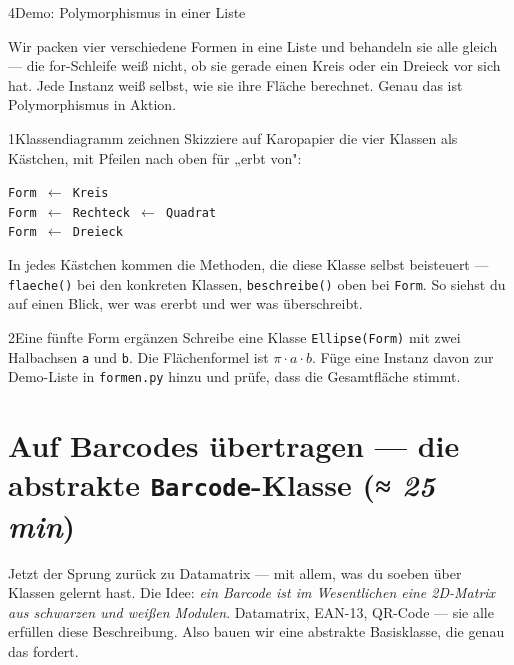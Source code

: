 \begin{pythoneinheit}{4}{Demo: Polymorphismus in einer Liste}

Wir packen vier verschiedene Formen in eine Liste und behandeln sie
alle gleich — die for-Schleife weiß nicht, ob sie gerade einen Kreis
oder ein Dreieck vor sich hat. Jede Instanz weiß selbst, wie sie ihre
Fläche berechnet. Genau das ist Polymorphismus in Aktion.
\end{pythoneinheit}

\begin{bleistiftuebung}{1}{Klassendiagramm zeichnen}
Skizziere auf Karopapier die vier Klassen als Kästchen, mit Pfeilen
nach oben für „erbt von":

\begin{center}
\texttt{Form $\leftarrow$ Kreis} \\
\texttt{Form $\leftarrow$ Rechteck $\leftarrow$ Quadrat} \\
\texttt{Form $\leftarrow$ Dreieck}
\end{center}

In jedes Kästchen kommen die Methoden, die diese Klasse selbst
beisteuert — \texttt{flaeche()} bei den konkreten Klassen,
\texttt{beschreibe()} oben bei \texttt{Form}. So siehst du auf einen
Blick, wer was ererbt und wer was überschreibt.
\end{bleistiftuebung}

\begin{bleistiftuebung}{2}{Eine fünfte Form ergänzen}
Schreibe eine Klasse \texttt{Ellipse(Form)} mit zwei Halbachsen
\texttt{a} und \texttt{b}. Die Flächenformel ist $\pi \cdot a \cdot b$.
Füge eine Instanz davon zur Demo-Liste in \texttt{formen.py} hinzu
und prüfe, dass die Gesamtfläche stimmt.
\end{bleistiftuebung}

\section{Auf Barcodes übertragen — die abstrakte \texttt{Barcode}-Klasse \normalfont(\textit{≈ 25 min})}

Jetzt der Sprung zurück zu Datamatrix — mit allem, was du soeben
über Klassen gelernt hast. Die Idee: \emph{ein Barcode ist im
Wesentlichen eine 2D-Matrix aus schwarzen und weißen Modulen}.
Datamatrix, EAN-13, QR-Code — sie alle erfüllen diese
Beschreibung. Also bauen wir eine abstrakte Basisklasse, die genau
das fordert.

